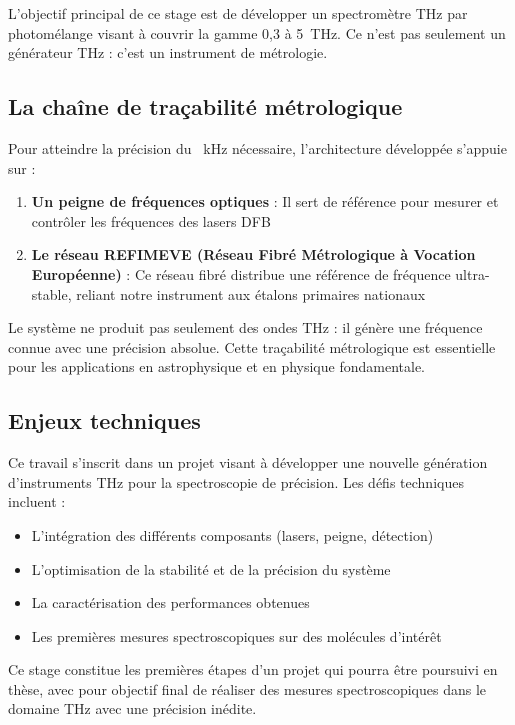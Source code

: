 L'objectif principal de ce stage est de développer un spectromètre THz par photomélange visant à couvrir la gamme 0,3 à \SI{5}{\THz}. Ce n'est pas seulement un générateur THz : c'est un instrument de métrologie.

\subsection{La chaîne de traçabilité métrologique}

Pour atteindre la précision du \SI{}{\kilo\hertz} nécessaire, l'architecture développée s'appuie sur :

\begin{enumerate}
    \item \textbf{Un peigne de fréquences optiques} : Il sert de référence pour mesurer et contrôler les fréquences des lasers DFB
    \item \textbf{Le réseau REFIMEVE (Réseau Fibré Métrologique à Vocation Européenne)} : Ce réseau fibré distribue une référence de fréquence ultra-stable, reliant notre instrument aux étalons primaires nationaux
\end{enumerate}

Le système ne produit pas seulement des ondes THz : il génère une fréquence connue avec une précision absolue. Cette traçabilité métrologique est essentielle pour les applications en astrophysique et en physique fondamentale.

\subsection{Enjeux techniques}

Ce travail s'inscrit dans un projet visant à développer une nouvelle génération d'instruments THz pour la spectroscopie de précision. Les défis techniques incluent :
\begin{itemize}
    \item L'intégration des différents composants (lasers, peigne, détection)
    \item L'optimisation de la stabilité et de la précision du système
    \item La caractérisation des performances obtenues
    \item Les premières mesures spectroscopiques sur des molécules d'intérêt
\end{itemize}

Ce stage constitue les premières étapes d'un projet qui pourra être poursuivi en thèse, avec pour objectif final de réaliser des mesures spectroscopiques dans le domaine THz avec une précision inédite.

